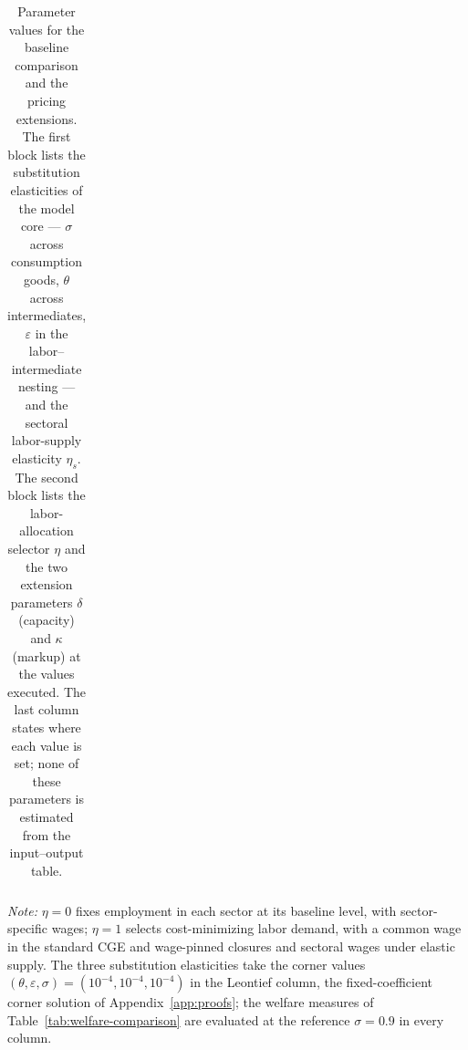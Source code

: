 \begin{table}[t]
\begin{tabular}{@{}l p{5.9cm} l l@{}}
\bottomrule
\end{tabular}
\par\smallskip
\parbox{\textwidth}{\footnotesize
\textit{Note:} $\eta=0$ fixes employment in each sector at its baseline level,
with sector-specific wages; $\eta=1$ selects cost-minimizing labor demand,
with a common wage in the standard CGE and wage-pinned closures and sectoral
wages under elastic supply. The three substitution elasticities take the
corner values $(\theta,\varepsilon,\sigma) = (10^{-4},10^{-4},10^{-4})$ in the
Leontief column, the fixed-coefficient corner solution of
Appendix~\ref{app:proofs}; the welfare measures of
Table~\ref{tab:welfare-comparison} are evaluated at the reference
$\sigma = 0.9$ in every column.}
\caption{Parameter values for the baseline comparison and the pricing extensions. The first block lists the substitution elasticities of the model core --- $\sigma$ across consumption goods, $\theta$ across intermediates, $\varepsilon$ in the labor--intermediate nesting --- and the sectoral labor-supply elasticity $\eta_s$. The second block lists the labor-allocation selector $\eta$ and the two extension parameters $\delta$ (capacity) and $\kappa$ (markup) at the values executed. The last column states where each value is set; none of these parameters is estimated from the input--output table.}
\label{tab:parameters}
\end{table}
